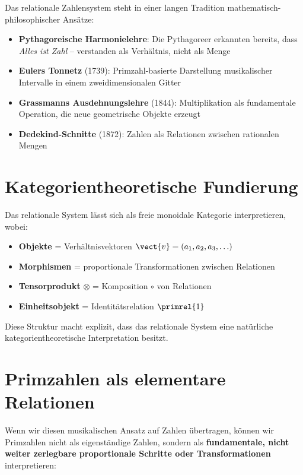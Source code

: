 	Das relationale Zahlensystem steht in einer langen Tradition mathematisch-philosophischer Ansätze:
	
	\begin{itemize}
		\item \textbf{Pythagoreische Harmonielehre}: Die Pythagoreer erkannten bereits, dass \emph{Alles ist Zahl} -- verstanden als Verhältnis, nicht als Menge
		\item \textbf{Eulers Tonnetz} (1739): Primzahl-basierte Darstellung musikalischer Intervalle in einem zweidimensionalen Gitter
		\item \textbf{Grassmanns Ausdehnungslehre} (1844): Multiplikation als fundamentale Operation, die neue geometrische Objekte erzeugt
		\item \textbf{Dedekind-Schnitte} (1872): Zahlen als Relationen zwischen rationalen Mengen
	\end{itemize}
	
	\section{Kategorientheoretische Fundierung}
	
	\begin{category}
		Das relationale System lässt sich als freie monoidale Kategorie interpretieren, wobei:
		\begin{itemize}
			\item \textbf{Objekte} = Verhältnisvektoren $\vect{v} = (a_1, a_2, a_3, \ldots)$
			\item \textbf{Morphismen} = proportionale Transformationen zwischen Relationen
			\item \textbf{Tensorprodukt} $\otimes$ = Komposition $\circ$ von Relationen
			\item \textbf{Einheitsobjekt} = Identitätsrelation $\primrel{1}$
		\end{itemize}
		
		Diese Struktur macht explizit, dass das relationale System eine natürliche kategorientheoretische Interpretation besitzt.
	\end{category}
	
	\section{Primzahlen als elementare Relationen}
	
	Wenn wir diesen musikalischen Ansatz auf Zahlen übertragen, können wir Primzahlen nicht als eigenständige Zahlen, sondern als \textbf{fundamentale, nicht weiter zerlegbare proportionale Schritte oder Transformationen} interpretieren:
	
